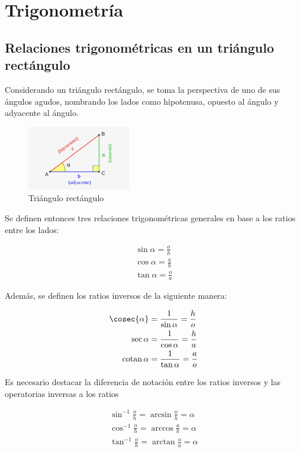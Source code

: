 \documentclass[spanish,12pt]{article}
\def\cotan{\qopname\relax o{cotan}}
\begin{document}
\section{Trigonometría}
\subsection{Relaciones trigonométricas en un triángulo rectángulo}

Considerando un triángulo rectángulo, se toma la perspectiva de uno de sus ángulos agudos, nombrando los lados como hipotenusa, opuesto al ángulo y adyacente al ángulo.

\begin{figure}[h]
\centering
\includegraphics[width=0.4\textwidth]{TR.jpg}
\caption{Triángulo rectángulo}
\end{figure}

Se definen entonces tres relaciones trigonométricas generales en base a los ratios entre los lados:

\begin{align*}
    \sin{\alpha}=\frac{o}{h}\\
    \cos{\alpha}=\frac{a}{h}\\
    \tan{\alpha}=\frac{o}{a}
\end{align*}

Además, se definen los ratios inversos de la siguiente manera:

\begin{align*}
    \cosec{\alpha}&=\frac{1}{\sin{\alpha}}=\frac{h}{o}\\
    \sec{\alpha}&=\frac{1}{\cos{\alpha}}=\frac{h}{a}\\
    \cotan{\alpha}&=\frac{1}{\tan{\alpha}}=\frac{a}{o}
\end{align*}

Es necesario destacar la diferencia de notación entre los ratios inversos y las operatorias inversas a los ratios

\begin{align*}
    \sin^{-1}{\frac{o}{h}}=\arcsin{\frac{o}{h}}=\alpha\\
    \cos^{-1}{\frac{o}{h}}=\arccos{\frac{a}{h}}=\alpha\\
    \tan^{-1}{\frac{o}{h}}=\arctan{\frac{o}{a}}=\alpha
\end{align*}
\end{document}
